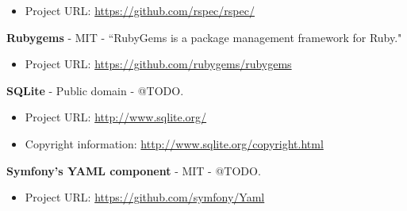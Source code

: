 \begin{itemize}
\item Project URL: \url{https://github.com/rspec/rspec/}
\end{itemize}

\textbf{Rubygems} - MIT - ``RubyGems is a package management framework for Ruby."

\begin{itemize}
\item Project URL: \url{https://github.com/rubygems/rubygems}
\end{itemize}

\textbf{SQLite} - Public domain - @TODO.

\begin{itemize}
\item Project URL: \url{http://www.sqlite.org/}
\item Copyright information: \url{http://www.sqlite.org/copyright.html}
\end{itemize}

\textbf{Symfony's YAML component} - MIT - @TODO.

\begin{itemize}
\item Project URL: \url{https://github.com/symfony/Yaml}
\end{itemize}